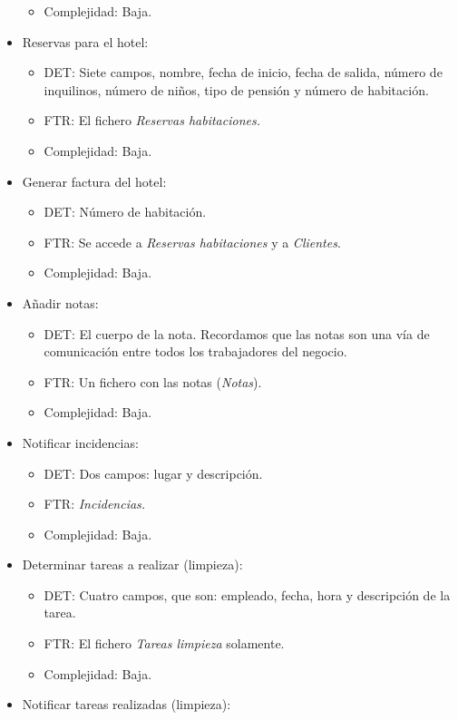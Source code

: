 \documentclass[spanish,a4paper,12pt]{report}	%
\begin{document}
\begin{itemize}
\begin{itemize}
			\item{Complejidad:} Baja.
		\end{itemize}
		\item{Reservas para el hotel:} 
		\begin{itemize}
 			\item{DET:} Siete campos, nombre, fecha de inicio, fecha de salida, número de inquilinos, número de niños, tipo de pensión y número de habitación.
			\item{FTR:} El fichero \textit{Reservas habitaciones.}
			\item{Complejidad:} Baja.	
		\end{itemize}		
		\item{Generar factura del hotel:} 
		\begin{itemize}
 			\item{DET:} Número de habitación.
			\item{FTR:} Se accede a \textit{Reservas habitaciones} y a \textit{Clientes}.
			\item{Complejidad:} Baja.
		\end{itemize}
		\item{Añadir notas:} 
		\begin{itemize}
 			\item{DET:} El cuerpo de la nota. Recordamos que las notas son una vía de comunicación entre todos los trabajadores del negocio.
			\item{FTR:} Un fichero con las notas (\textit{Notas}).
			\item{Complejidad:} Baja.
		\end{itemize}
		\item{Notificar incidencias:} 
		\begin{itemize}
 			\item{DET:} Dos campos: lugar y descripción.
			\item{FTR:} \textit{Incidencias.}
			\item{Complejidad:} Baja.
		\end{itemize}
		\item{Determinar tareas a realizar (limpieza):} 
		\begin{itemize}
 			\item{DET:} Cuatro campos, que son: empleado, fecha, hora y descripción de la tarea.
			\item{FTR:} El fichero \textit{Tareas limpieza} solamente.
			\item{Complejidad:} Baja.
		\end{itemize}
		\item{Notificar tareas realizadas (limpieza):} 

\end{itemize}
\end{document}
